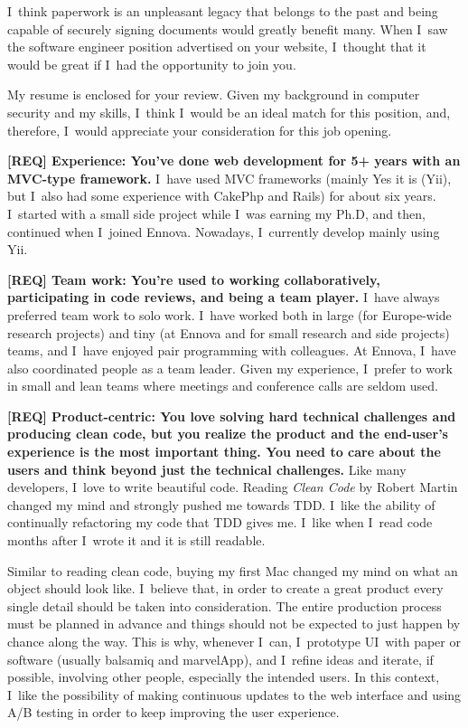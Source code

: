 \documentclass[a4paper,sans]{moderncv} %
\begin{document}
\makelettertitle %

\justify

I~think paperwork is an unpleasant legacy that belongs to the past and being capable of securely signing documents would greatly benefit many. When I~saw the software engineer position advertised on your website, I~thought that it would be great if I~had the opportunity to join you.

My resume is enclosed for your review. Given my background in computer security and my skills, I~think I~would be an ideal match for this position, and, therefore, I~would appreciate your consideration for this job opening.

\textbf{[REQ] Experience: You’ve done web development for 5+ years with an MVC-type framework.}
I~have used MVC frameworks (mainly Yes it is (Yii), but I~also had some experience with CakePhp and Rails) for about six years. I~started with a small side project while I~was earning my Ph.D, and then, continued when I~joined Ennova. Nowadays, I~currently develop mainly using Yii.

\textbf{[REQ] Team work: You’re used to working collaboratively, participating in code reviews, and being a team player.}
I~have always preferred team work to solo work. I~have worked both in large (for Europe-wide research projects) and tiny (at Ennova and for small research and side projects) teams, and I~have enjoyed pair programming with colleagues. At Ennova, I~have also coordinated people as a team leader.
Given my experience, I~prefer to work in small and lean teams where meetings and conference calls are seldom used.

\textbf{[REQ] Product-centric: You love solving hard technical challenges and producing clean code, but you realize the product and the end-user’s experience is the most important thing. You need to care about the users and think beyond just the technical challenges.}
Like many developers, I~love to write beautiful code. Reading \textit{Clean Code} by Robert Martin changed my mind and strongly pushed me towards TDD. I~like the ability of continually refactoring my code that TDD gives me. I~like when I~read code months after I~wrote it and it is still readable.

Similar to reading clean code, buying my first Mac changed my mind on what an object should look like.
I~believe that, in order to create a great product every single detail should be taken into consideration.
The entire production process must be planned in advance and things should not be expected to just happen by chance along the way.
This is why, whenever I~can, I~prototype UI~with paper or software (usually balsamiq and marvelApp), and I~refine ideas and iterate, if possible, involving other people, especially the intended users.
In this context, I~like the possibility of making continuous updates to the web interface and using A/B testing in order to keep improving the user experience.
\end{document}
